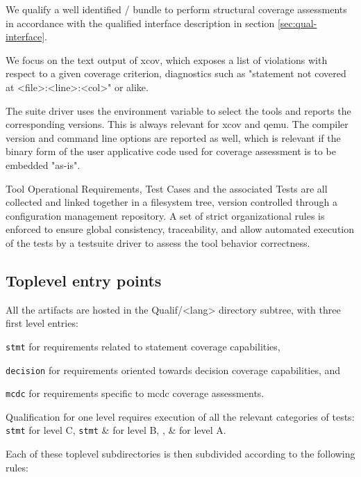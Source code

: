 \documentclass {report}
\begin{document}
We qualify a well identified \xcov{}/\qemu{} bundle to perform structural
coverage assessments in accordance with the qualified interface description in
section \ref{sec:qual-interface}.

We focus on the  text output of xcov, which exposes a
list of violations with respect to a given coverage criterion, diagnostics
such as "statement not covered at <file>:<line>:<col>" or alike.

The suite driver uses the  environment variable to select the tools
and reports the corresponding versions. This is always relevant for xcov and
qemu.
%
The compiler version and command line options are reported as well, which is
relevant if the binary form of the user applicative code used for coverage
assessment is to be embedded "as-is".

Tool Operational Requirements, Test Cases and the associated Tests are
all collected and linked together in a filesystem tree, version controlled
through a configuration management repository.
%
A set of strict organizational rules is enforced to ensure global consistency,
traceability, and allow automated execution of the tests by a testsuite driver
to assess the tool behavior correctness.

\subsection{Toplevel entry points}

All the artifacts are hosted in the Qualif/<lang> directory subtree, with
three first level entries:

\begin{Itemize}
\item \texttt{stmt} for requirements related to statement coverage
   capabilities,
%
\item \texttt{decision} for requirements oriented towards decision coverage
   capabilities, and
%
\item \texttt{mcdc} for requirements specific to mcdc coverage assessments.
\end{Itemize}

Qualification for one \do{} level requires execution of all the relevant
categories of tests: \texttt{stmt} for level C, \texttt{stmt} \& 
for level B, ,  \&  for level A.

Each of these toplevel subdirectories is then subdivided according to
the following rules:
\end{document}
